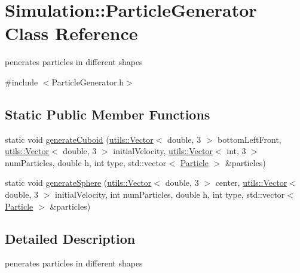 \hypertarget{classSimulation_1_1ParticleGenerator}{\section{Simulation\-:\-:Particle\-Generator Class Reference}
\label{classSimulation_1_1ParticleGenerator}
}


penerates particles in different shapes  




{\ttfamily \#include $<$Particle\-Generator.\-h$>$}

\subsection*{Static Public Member Functions}
\begin{DoxyCompactItemize}
\item 
static void \hyperlink{classSimulation_1_1ParticleGenerator_a8fb7273c9b825209540396c1cbacf574}{generate\-Cuboid} (\hyperlink{classutils_1_1Vector}{utils\-::\-Vector}$<$ double, 3 $>$ bottom\-Left\-Front, \hyperlink{classutils_1_1Vector}{utils\-::\-Vector}$<$ double, 3 $>$ initial\-Velocity, \hyperlink{classutils_1_1Vector}{utils\-::\-Vector}$<$ int, 3 $>$ num\-Particles, double h, int type, std\-::vector$<$ \hyperlink{classSimulation_1_1Particle}{Particle} $>$ \&particles)
\item 
static void \hyperlink{classSimulation_1_1ParticleGenerator_a1726b3093c82abebf17baf580e5137f4}{generate\-Sphere} (\hyperlink{classutils_1_1Vector}{utils\-::\-Vector}$<$ double, 3 $>$ center, \hyperlink{classutils_1_1Vector}{utils\-::\-Vector}$<$ double, 3 $>$ initial\-Velocity, int num\-Particles, double h, int type, std\-::vector$<$ \hyperlink{classSimulation_1_1Particle}{Particle} $>$ \&particles)
\end{DoxyCompactItemize}


\subsection{Detailed Description}
penerates particles in different shapes 

